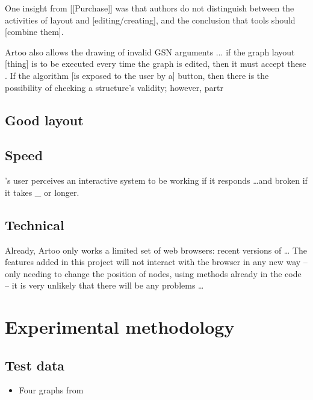 One insight from [[Purchase]] was that authors do not distinguish between the activities of layout and [editing/creating], and the conclusion that tools should [combine them]. 


Artoo also allows the drawing of invalid GSN arguments ...
if the graph layout [thing] is to be executed every time the graph is edited,  then it must accept these .
If the algorithm [is exposed to the user by a] button, then there is the possibility of checking a structure's validity; however, partr



\subsection{Good layout}


\subsection{Speed}


\citeauthor{Miller:1968:RTM:1476589.1476628}'s  user perceives an interactive system to be working if it responds \ldots and broken if it takes \_ or longer.



\subsection{Technical}

Already, Artoo only works a limited set of web browsers: recent versions of \ldots
The features added in this project will not interact with the browser in any new way -- only needing to change the position of nodes, using methods already in the code -- it is very unlikely that there will be any problems \ldots



\section{Experimental methodology}


\subsection{Test data}

\begin{itemize}
    \item Four graphs from \citet{aldenthesis}
\end{itemize}

